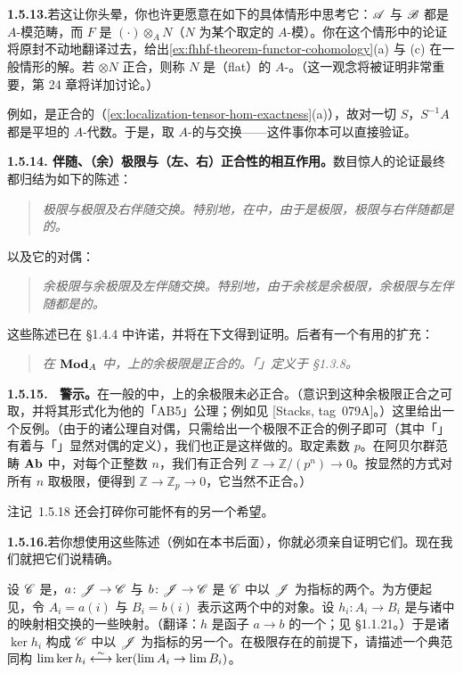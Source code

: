 \textbf{1.5.13.}\quad 若这让你头晕，你也许更愿意在如下的具体情形中思考它：$\mathscr{A}$ 与 $\mathscr{B}$ 都是 $A$-模范畴，而 $F$ 是 $(\cdot)\otimes_A N$（$N$ 为某个取定的 $A$-模）。你在这个情形中的论证将原封不动地翻译过去，给出\cref{ex:fhhf-theorem-functor-cohomology}(a) 与 (c) 在一般情形的解。若 $\otimes N$ 正合，则称 $N$ 是\trFlat{}（flat）的 $A$-\trModule。（\trFlatness{}这一观念将被证明非常重要，第 24 章将详加讨论。）

例如，\trLocalization{}是正合的（\cref{ex:localization-tensor-hom-exactness}(a)），故对一切\trMultiplicativeSubset{} $S$，$S^{-1}A$ 都是平坦的 $A$-代数。于是，取 $A$-\trComplexes{}的\trCohomology{}与\trLocalization{}交换——这件事你本可以直接验证。

\textbf{1.5.14. 伴随、（余）极限与（左、右）正合性的相互作用。}\quad 数目惊人的论证最终都归结为如下的陈述：
\begin{quote}\itshape
极限与极限及右伴随交换。特别地，在\trAbelianCategory{}中，由于\trKernel{}是极限，极限与右伴随都是\trLeftExact{}的。
\end{quote}
以及它的对偶：
\begin{quote}\itshape
余极限与余极限及左伴随交换。特别地，由于余核是余极限，余极限与左伴随都是\trRightExact{}的。
\end{quote}
这些陈述已在 \S1.4.4 中许诺，并将在下文得到证明。后者有一个有用的扩充：
\begin{quote}\itshape
在 $\mathbf{Mod}_{A}$ 中，\trFiltered{}\trIndexCategory{}上的余极限是正合的。「\trFiltered」定义于 \S1.3.8。
\end{quote}

\textbf{1.5.15. \extrahard\ 警示。}\quad 在一般的\trAbelianCategory{}中，\trFiltered{}\trIndexCategory{}上的余极限未必正合。（\trGrothendieck{}意识到这种余极限正合之可取，并将其形式化为他的「AB5」公理；例如见 [Stacks, tag~079A]。）这里给出一个反例。（由于\trAbelianCategory{}的诸公理自对偶，只需给出一个\trCofiltered{}极限不正合的例子即可（其中「\trCofiltered」有着与「\trFiltered」显然对偶的定义），我们也正是这样做的。取定素数 $p$。在阿贝尔群范畴 $\mathbf{Ab}$ 中，对每个正整数 $n$，我们有正合列 $\mathbb{Z}\to\mathbb{Z}/(p^{n})\to 0$。按显然的方式对所有 $n$ 取极限，便得到 $\mathbb{Z}\to\mathbb{Z}_p\to 0$，它当然不正合。）

注记~1.5.18 还会打碎你可能怀有的另一个希望。

\textbf{1.5.16.}\quad 若你想使用这些陈述（例如在本书后面），你就必须亲自证明它们。现在我们就把它们说精确。

\begin{exercise}[核与极限交换]\label{ex:kernels-commute-with-limits}
设 $\mathscr{C}$ 是\trAbelianCategory，$a\colon\mathscr{J}\to\mathscr{C}$ 与 $b\colon\mathscr{J}\to\mathscr{C}$ 是 $\mathscr{C}$ 中以 $\mathscr{J}$ 为指标的两个\trDiagram。为方便起见，令 $A_i=a(i)$ 与 $B_i=b(i)$ 表示这两个\trDiagram{}中的对象。设 $h_i\colon A_i\to B_i$ 是与诸\trDiagram{}中的映射相交换的一些映射。（翻译：$h$ 是函子 $a\to b$ 的一个\trNaturalTransformation；见 \S1.1.21。）于是诸 $\ker h_i$ 构成 $\mathscr{C}$ 中以 $\mathscr{J}$ 为指标的另一个\trDiagram。在极限存在的前提下，请描述一个典范同构
$\lim\ker h_i\mathrel{\overset{\sim}{\leftarrow\joinrel\rightarrow}}\ker(\lim A_i\to\lim B_i)$。
\end{exercise}


